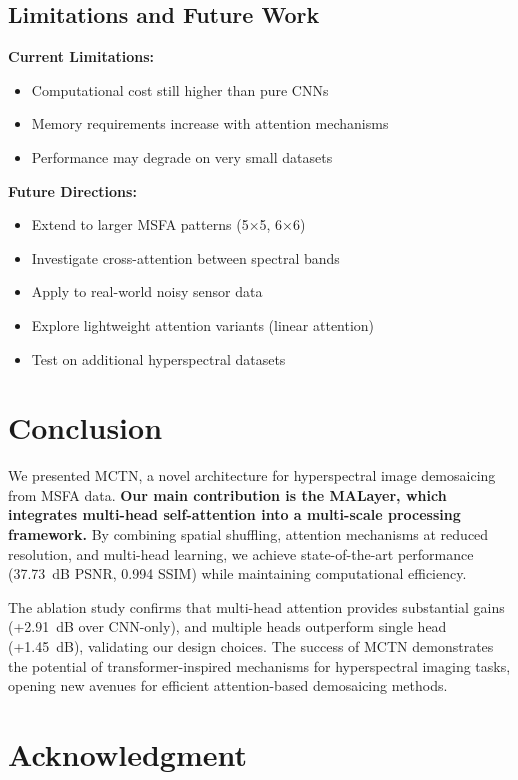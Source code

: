 \documentclass[conference]{IEEEtran}
\begin{document}
\subsection{Limitations and Future Work}

\textbf{Current Limitations:}
\begin{itemize}
    \item Computational cost still higher than pure CNNs
    \item Memory requirements increase with attention mechanisms
    \item Performance may degrade on very small datasets
\end{itemize}

\textbf{Future Directions:}
\begin{itemize}
    \item Extend to larger MSFA patterns (5×5, 6×6)
    \item Investigate cross-attention between spectral bands
    \item Apply to real-world noisy sensor data
    \item Explore lightweight attention variants (linear attention)
    \item Test on additional hyperspectral datasets
\end{itemize}

\section{Conclusion}

We presented MCTN, a novel architecture for hyperspectral image demosaicing from MSFA data. \textbf{Our main contribution is the MALayer, which integrates multi-head self-attention into a multi-scale processing framework.} By combining spatial shuffling, attention mechanisms at reduced resolution, and multi-head learning, we achieve state-of-the-art performance (37.73~dB PSNR, 0.994 SSIM) while maintaining computational efficiency.

The ablation study confirms that multi-head attention provides substantial gains (+2.91~dB over CNN-only), and multiple heads outperform single head (+1.45~dB), validating our design choices. The success of MCTN demonstrates the potential of transformer-inspired mechanisms for hyperspectral imaging tasks, opening new avenues for efficient attention-based demosaicing methods.

\section*{Acknowledgment}
\end{document}
